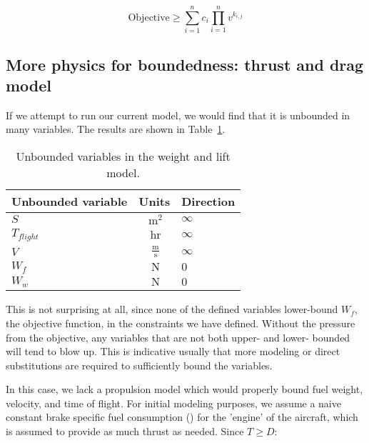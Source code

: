 \begin{equation}
    \mathrm{Objective} \geq \sum\limits^n_{i=1}c_{i}\prod\limits^n_{i=1}  v^{k_{i,j}}
    \label{e:posyobj}
\end{equation}

\subsection{More physics for boundedness: thrust and drag model}
\label{s:td}

If we attempt to run our current model, we would find that it is unbounded in many variables.
The results are shown in Table~\ref{t:WandL_unbounded}.

\begin{footnotesize}
\begin{table}[H]
    \begin{center}
    \begin{tabular}{ l c l }
        \toprule
        Unbounded variable & Units & Direction \\
        \midrule
        $S$ & $~\mathrm{m^{2}}$ & $\infty$ \\
        $T_{flight}$ & $~\mathrm{hr}$ & $\infty$ \\
        $V$ &  $~\mathrm{\tfrac{m}{s}}$  & $\infty$ \\
        $W_f$ & $~\mathrm{N}$ & $0$ \\
        $W_w$ & $~\mathrm{N}$  & $0$ \\
        \bottomrule
    \end{tabular}
    \end{center}
    \caption{Unbounded variables in the weight and lift model.}
    \label{t:WandL_unbounded}
\end{table} \end{footnotesize}

This is not surprising at all, since none of the defined variables lower-bound $W_f$,
the objective function, in the constraints we have defined.
Without the pressure from the objective, any variables that
are not both upper- and lower- bounded will tend to blow up. This is indicative usually
that more modeling or direct substitutions are required to sufficiently bound the variables.

In this case, we lack a propulsion model which would properly bound fuel weight, velocity,
and time of flight. For initial modeling purposes, we assume a naive constant brake
specific fuel consumption (\BSFC) for the 'engine' of the aircraft, which is assumed
to provide as much thrust as needed. Since $T \geq D$:

